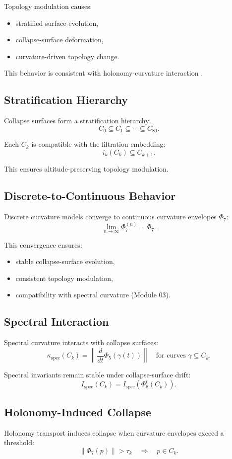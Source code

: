 Topology modulation causes:
\begin{itemize}
    \item stratified surface evolution,
    \item collapse-surface deformation,
    \item curvature-driven topology change.
\end{itemize}

This behavior is consistent with holonomy-curvature interaction
.

\subsection{Stratification Hierarchy}
Collapse surfaces form a stratification hierarchy:
\[
C_0 \subseteq C_1 \subseteq \cdots \subseteq C_{80}.
\]

Each $C_k$ is compatible with the filtration embedding:
\[
i_k(C_k) \subseteq C_{k+1}.
\]

This ensures altitude-preserving topology modulation.

\subsection{Discrete-to-Continuous Behavior}
Discrete curvature models  converge to continuous
curvature envelopes $\Phi_7$:
\[
\lim_{n \to \infty} \Phi_7^{(n)} = \Phi_7.
\]

This convergence ensures:
\begin{itemize}
    \item stable collapse-surface evolution,
    \item consistent topology modulation,
    \item compatibility with spectral curvature (Module 03).
\end{itemize}

\subsection{Spectral Interaction}
Spectral curvature interacts with collapse surfaces:
\[
\kappa_{\mathrm{spec}}(C_k)
=
\left\| \frac{d}{dt} \Phi_5(\gamma(t)) \right\|
\quad
\text{for curves } \gamma \subseteq C_k.
\]

Spectral invariants remain stable under collapse-surface drift:
\[
I_{\mathrm{spec}}(C_k) = I_{\mathrm{spec}}(\Phi_8^t(C_k)).
\]

\subsection{Holonomy-Induced Collapse}
Holonomy transport induces collapse when curvature envelopes exceed a threshold:
\[
\|\Phi_7(p)\| > \tau_k \quad \Rightarrow \quad p \in C_k.
\]

